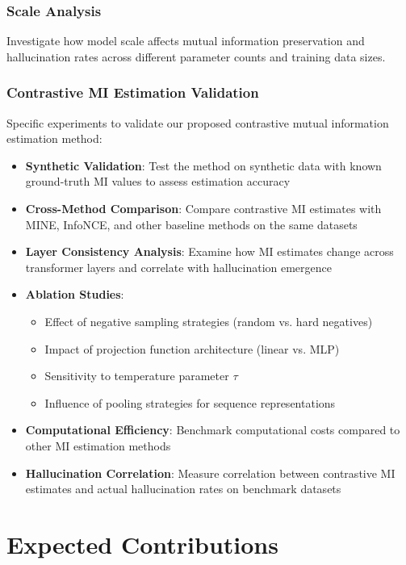 \subsubsection{Scale Analysis}
Investigate how model scale affects mutual information preservation and hallucination rates across different parameter counts and training data sizes.

\subsubsection{Contrastive MI Estimation Validation}
Specific experiments to validate our proposed contrastive mutual information estimation method:

\begin{itemize}
    \item \textbf{Synthetic Validation}: Test the method on synthetic data with known ground-truth MI values to assess estimation accuracy
    \item \textbf{Cross-Method Comparison}: Compare contrastive MI estimates with MINE, InfoNCE, and other baseline methods on the same datasets
    \item \textbf{Layer Consistency Analysis}: Examine how MI estimates change across transformer layers and correlate with hallucination emergence
    \item \textbf{Ablation Studies}:
    \begin{itemize}
        \item Effect of negative sampling strategies (random vs. hard negatives)
        \item Impact of projection function architecture (linear vs. MLP)
        \item Sensitivity to temperature parameter $\tau$
        \item Influence of pooling strategies for sequence representations
    \end{itemize}
    \item \textbf{Computational Efficiency}: Benchmark computational costs compared to other MI estimation methods
    \item \textbf{Hallucination Correlation}: Measure correlation between contrastive MI estimates and actual hallucination rates on benchmark datasets
\end{itemize}

\section{Expected Contributions}
\label{sec:contributions}

